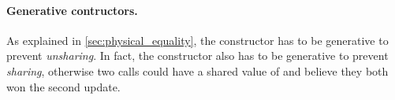 \paragraph{Generative contructors.}
As explained in \cref{sec:physical_equality}, the  constructor has to be generative to prevent \emph{unsharing}.
In fact, the  constructor also has to be generative to prevent \emph{sharing}, otherwise two calls could have a shared value of  and believe they both won the second update.

